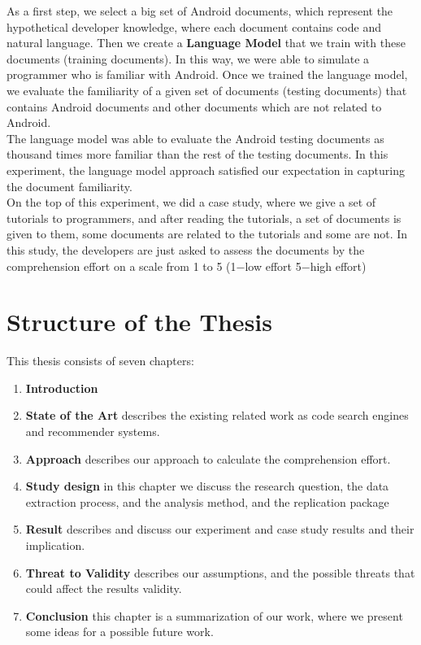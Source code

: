 \documentclass[12pt,mscthesis]{usiinfthesis}
\begin{document}
	 As a first step, we select a big set of Android documents, which represent the hypothetical developer knowledge, where each document contains code and natural language. Then we create a \textbf{ Language Model} that we train with these documents (training documents). In this way, we were able to simulate a programmer who is familiar with Android. Once we trained the language model, we evaluate the familiarity of a given set of documents (testing documents) that contains Android documents and other documents which are not related to Android.\\ 
	 The language model was able to evaluate the Android testing documents as thousand times more familiar than the rest of the testing documents.
	 In this experiment, the language model approach satisfied our expectation in capturing the document familiarity.\\

	 On the top of this experiment, we did a case study, where we give a set of tutorials to programmers, and after reading the tutorials, a set of documents is given to them, some documents are related to the tutorials and some are not. In this study, the developers are just asked to assess the documents by the comprehension effort on a scale from 1 to 5 (1$-$low effort 5$-$high effort)
	 \newpage

	\section{Structure of the Thesis}
	This thesis consists of seven chapters: 
	\begin{enumerate}
	
		\item \textbf{Introduction}
		\item \textbf{State of the Art} describes the existing related work as code search engines and recommender systems.
		\item \textbf{Approach} describes our approach to calculate the comprehension effort.
		\item \textbf{Study design} in this chapter we discuss the research question, the data extraction process, and the analysis method, and the replication package 
		\item \textbf{Result} describes and discuss our experiment and case study results and their implication.
		\item \textbf{Threat to Validity} describes our assumptions, and the possible threats that could affect the results validity.
		\item \textbf{Conclusion} this chapter is a summarization of our work, where we present some ideas for a possible future work.
	\end{enumerate}
\end{document}
